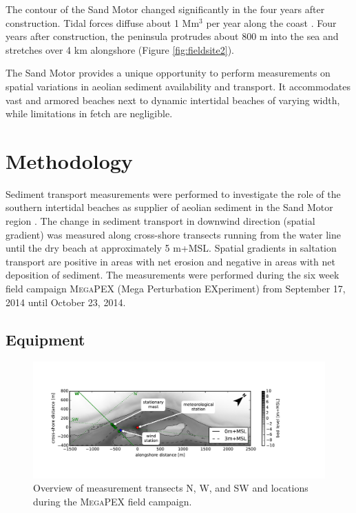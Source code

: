 The contour of the Sand Motor changed significantly in the four years
after construction. Tidal forces diffuse about 1 $\mathrm{Mm^3}$ per
year along the coast \citep{deSchipper2016}. Four years after
construction, the peninsula protrudes about 800 m into the sea and
stretches over 4 km alongshore (Figure \ref{fig:fieldsite2}).


The Sand Motor provides a unique opportunity to perform measurements
on spatial variations in aeolian sediment availability and transport.
It accommodates vast and armored beaches next to dynamic intertidal
beaches of varying width, while limitations in fetch are negligible.

\section{Methodology}

Sediment transport measurements were performed to investigate the role
of the southern intertidal beaches as supplier of aeolian sediment in
the Sand Motor region \citep{Hoonhout2017a}. The change in sediment
transport in downwind direction (spatial gradient) was measured along
cross-shore transects running from the water line until the dry beach
at approximately 5 m+MSL. Spatial gradients in saltation transport are
positive in areas with net erosion and negative in areas with net
deposition of sediment. The measurements were performed
during the six week field campaign \textsc{MegaPEX} (Mega Perturbation
EXperiment) from September 17, 2014 until October 23, 2014.

\subsection{Equipment}

\begin{figure}
 \centering
  \includegraphics[width=\columnwidth]{../Figures/overview}
  \caption{Overview of measurement transects N, W, and SW and
    locations during the \textsc{MegaPEX} field campaign.}
  \label{fig:overview}
\end{figure}

